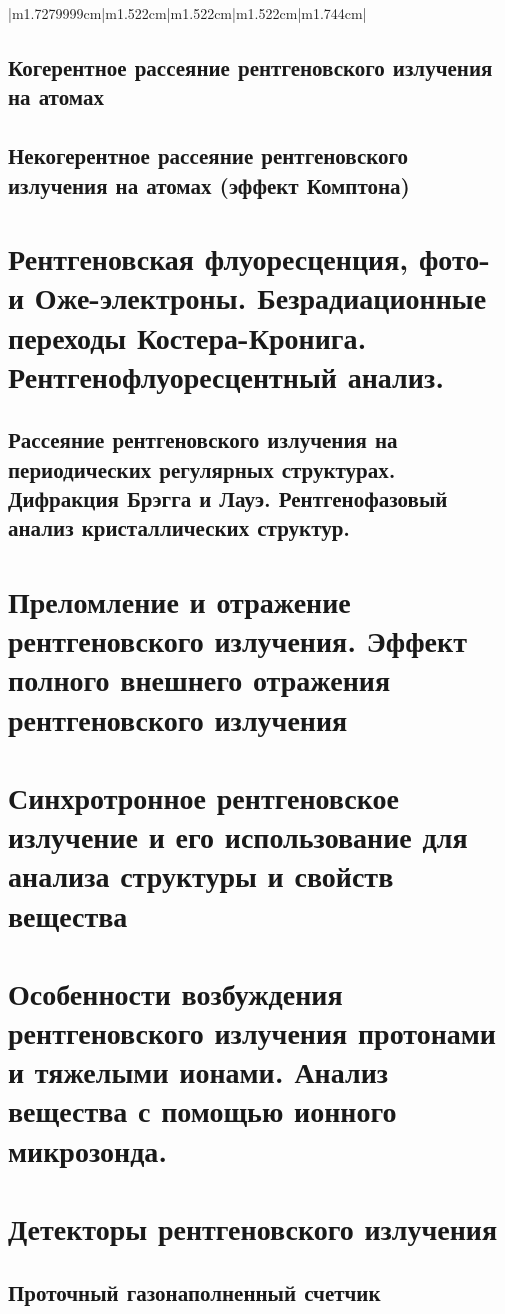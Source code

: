 \documentclass[a4paper,14pt, openany, twoside, draft]{extbook} %
\begin{document}
\begin{flushleft}
\begin{supertabular}{|m{1.7279999cm}|m{1.522cm}|m{1.522cm}|m{1.522cm}|m{1.744cm}|}
\section{Когерентное рассеяние рентгеновского излучения на атомах}
\section{Некогерентное рассеяние рентгеновского излучения на атомах (эффект Комптона)}

\chapter{Рентгеновская флуоресценция, фото- и Оже-электроны. Безрадиационные переходы Костера-Кронига. Рентгенофлуоресцентный анализ.}
\label{cha:xray-analisys}

\section{Рассеяние рентгеновского излучения на периодических регулярных структурах. Дифракция Брэгга и Лауэ. Рентгенофазовый анализ кристаллических структур.}
\label{sec:bragg-diffraction}

\chapter{Преломление и отражение рентгеновского излучения. Эффект полного внешнего отражения рентгеновского излучения}
\label{cha:total-reflection}

\chapter{Синхротронное рентгеновское излучение и его использование для анализа структуры и свойств вещества}
\label{cha:syncrotron}

\chapter{Особенности возбуждения рентгеновского излучения протонами и тяжелыми ионами. Анализ вещества с помощью ионного микрозонда.}
\label{cha:ion-micro}

\chapter{Детекторы рентгеновского излучения}
\label{cha:detectors}

\section{Проточный газонаполненный счетчик}

\end{supertabular}
\end{flushleft}
\end{document}

